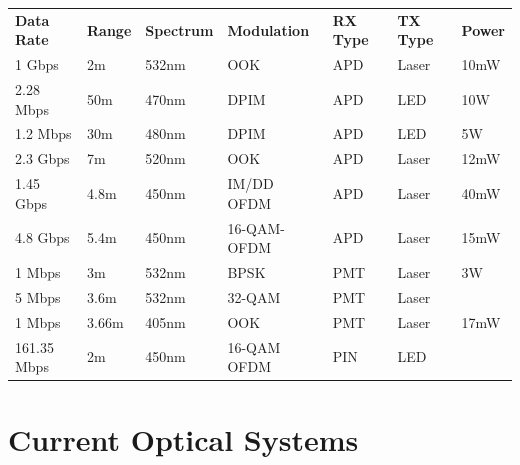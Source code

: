 \documentclass{article}
\begin{document}
\begin{table}[H]
\begin{tabular}{lllllll}
\textbf{Data Rate} & \textbf{Range} & \textbf{Spectrum} & \textbf{Modulation} & \textbf{RX Type} & \textbf{TX Type} & \textbf{Power} \\
1 Gbps             & 2m                  & 532nm                    & OOK       & APD                    & Laser                     & 10mW           \\
2.28 Mbps          & 50m                 & 470nm                    & DPIM                       & APD                    & LED                       & 10W            \\
1.2 Mbps           & 30m                 & 480nm                    & DPIM                       & APD                    & LED                       & 5W             \\
2.3 Gbps           & 7m                  & 520nm                    & OOK                        & APD                    & Laser                     & 12mW           \\
1.45 Gbps          & 4.8m                & 450nm                    & IM/DD OFDM                 & APD                    & Laser                     & 40mW           \\
4.8 Gbps           & 5.4m                & 450nm                    & 16-QAM-OFDM                & APD                    & Laser                     & 15mW           \\
1 Mbps             & 3m                  & 532nm                    & BPSK                       & PMT                    & Laser                     & 3W             \\
5 Mbps             & 3.6m                & 532nm                    & 32-QAM                     & PMT                    & Laser                     &                \\
1 Mbps             & 3.66m               & 405nm                    & OOK                        & PMT                    & Laser                     & 17mW           \\
161.35 Mbps        & 2m                  & 450nm                    & 16-QAM OFDM                & PIN                    & LED                       &               
\end{tabular}
\end{table}

\section{Current Optical Systems}
\end{document}
